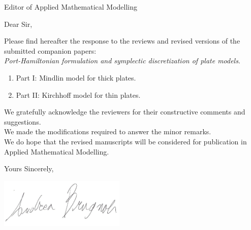 \documentclass[pdftex,a4paper,12pt,origdate]{letter}
\begin{document}

\begin{letter}{Editor of Applied Mathematical Modelling}



\opening{Dear  Sir,}


Please find hereafter the response to the reviews and revised versions of the submitted companion papers:\\


{\em Port-Hamiltonian formulation and symplectic discretization of plate models}.
\vspace{-5mm}
\begin{enumerate}
\item Part I: Mindlin model for thick plates.
\item Part II: Kirchhoff model for thin plates.
\end{enumerate}

We gratefully acknowledge the reviewers for their constructive comments and suggestions. \\

We made the modifications required to answer the minor remarks.\\

We do hope that the revised manuscripts will be considered for publication in Applied
Mathematical Modelling.


\closing{Yours Sincerely,}

\flushleft
\includegraphics[angle=90,width=6cm]{Signature_HighContrast.jpg}

\end{letter}
\end{document}

